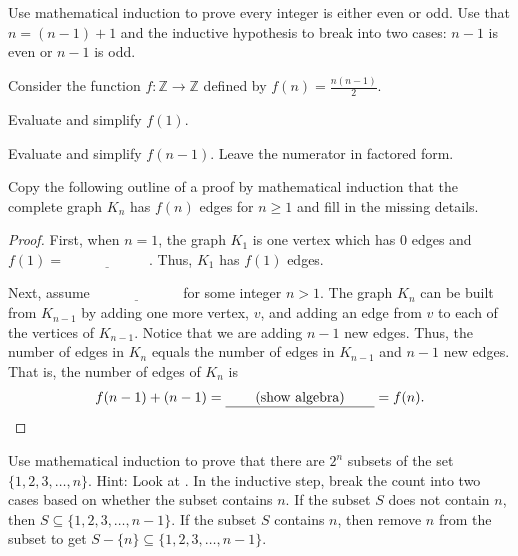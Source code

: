 \begin{exer}[\exerU] %
\label{exer_math_ind_every_int_even_or_odd}
    Use mathematical induction to prove every integer is either even or odd.  Use that $n=(n-1)+1$ and the inductive hypothesis to break into two cases: $n-1$ is even or $n-1$ is odd.
\end{exer}

\begin{exer}[\exerU] %
\label{exer_count_edges_Kn_proof_ind}
    Consider the function $f: \mathbb{Z} \to \mathbb{Z}$ defined by $f(n) = \frac{n(n-1)}{2}$.
        \begin{exerpart}
            \item Evaluate and simplify $f(1)$.
            \item Evaluate and simplify $f(n-1)$. Leave the numerator in factored form.
            \item  Copy the following outline of a proof by mathematical induction that the complete graph $K_n$ has $f(n)$ edges for $n \ge 1$ and fill in the missing details.

            \begin{proof}
                First, when $n=1$, the graph $K_1$ is one vertex which has 0 edges and $f(1)=\underline{\hspace{1in}}$.  Thus, $K_1$ has $f(1)$ edges.

                Next, assume $\underline{\hspace{1in}}$ for some integer $n > 1$.  The graph $K_n$ can be built from $K_{n-1}$ by adding one more vertex, $v$, and adding an edge from $v$ to each of the vertices of $K_{n-1}$.  Notice that we are adding $n-1$ new edges.  Thus, the number of edges in $K_n$ equals the number of edges in $K_{n-1}$ and $n-1$ new edges. That is, the number of edges of $K_n$ is $$f(n-1) + (n-1) = \underline{\hspace{.25in} \text{ (show algebra) }\hspace{.25in}} = f(n).$$
            \end{proof}
    \end{exerpart}
\end{exer}

\begin{exer}[\exerU] %
\label{exer_math_ind_number_subsets}
    Use mathematical induction to prove that there are $2^n$ subsets of the set $\{1,2,3,\ldots,n\}$.  Hint: Look at .  In the inductive step, break the count into two cases based on whether the subset contains $n$. If the subset $S$ does not contain $n$, then $S \subseteq \{1,2,3, \ldots, n-1\}$.  If the subset $S$ contains $n$, then remove $n$ from the subset to get $S - \{n\} \subseteq \{1,2,3, \ldots, n-1\}$.
\end{exer}

